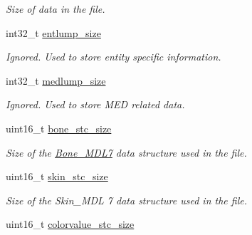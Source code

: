 \begin{DoxyCompactItemize}
\begin{DoxyCompactList}\small\item\em Size of data in the file. \end{DoxyCompactList}\item 
\hypertarget{struct_assimp_1_1_m_d_l_1_1_header___m_d_l7_a0808b8160de751388299ce8925032d2b}{int32\+\_\+t \hyperlink{struct_assimp_1_1_m_d_l_1_1_header___m_d_l7_a0808b8160de751388299ce8925032d2b}{entlump\+\_\+size}}\label{struct_assimp_1_1_m_d_l_1_1_header___m_d_l7_a0808b8160de751388299ce8925032d2b}

\begin{DoxyCompactList}\small\item\em Ignored. Used to store entity specific information. \end{DoxyCompactList}\item 
\hypertarget{struct_assimp_1_1_m_d_l_1_1_header___m_d_l7_a7d91dc67ebdc32051ef392a6c45170d8}{int32\+\_\+t \hyperlink{struct_assimp_1_1_m_d_l_1_1_header___m_d_l7_a7d91dc67ebdc32051ef392a6c45170d8}{medlump\+\_\+size}}\label{struct_assimp_1_1_m_d_l_1_1_header___m_d_l7_a7d91dc67ebdc32051ef392a6c45170d8}

\begin{DoxyCompactList}\small\item\em Ignored. Used to store M\+E\+D related data. \end{DoxyCompactList}\item 
\hypertarget{struct_assimp_1_1_m_d_l_1_1_header___m_d_l7_aa125ce7f7bf668ba11c90d04829411f3}{uint16\+\_\+t \hyperlink{struct_assimp_1_1_m_d_l_1_1_header___m_d_l7_aa125ce7f7bf668ba11c90d04829411f3}{bone\+\_\+stc\+\_\+size}}\label{struct_assimp_1_1_m_d_l_1_1_header___m_d_l7_aa125ce7f7bf668ba11c90d04829411f3}

\begin{DoxyCompactList}\small\item\em Size of the \hyperlink{struct_assimp_1_1_m_d_l_1_1_bone___m_d_l7}{Bone\+\_\+\+M\+D\+L7} data structure used in the file. \end{DoxyCompactList}\item 
\hypertarget{struct_assimp_1_1_m_d_l_1_1_header___m_d_l7_a14ac61deaac63aa9ed60ace6f91ecda7}{uint16\+\_\+t \hyperlink{struct_assimp_1_1_m_d_l_1_1_header___m_d_l7_a14ac61deaac63aa9ed60ace6f91ecda7}{skin\+\_\+stc\+\_\+size}}\label{struct_assimp_1_1_m_d_l_1_1_header___m_d_l7_a14ac61deaac63aa9ed60ace6f91ecda7}

\begin{DoxyCompactList}\small\item\em Size of the Skin\+\_\+\+M\+D\+L 7 data structure used in the file. \end{DoxyCompactList}\item 
\hypertarget{struct_assimp_1_1_m_d_l_1_1_header___m_d_l7_a91c279a39c690534b178850e07254b96}{uint16\+\_\+t \hyperlink{struct_assimp_1_1_m_d_l_1_1_header___m_d_l7_a91c279a39c690534b178850e07254b96}{colorvalue\+\_\+stc\+\_\+size}}\label{struct_assimp_1_1_m_d_l_1_1_header___m_d_l7_a91c279a39c690534b178850e07254b96}


\end{DoxyCompactItemize}
